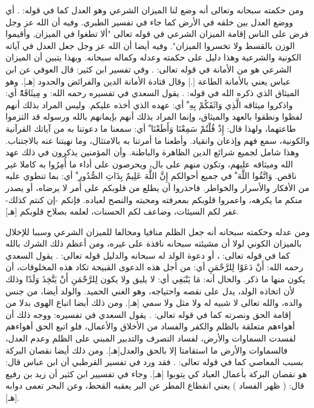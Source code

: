 ومن حكمته سبحانه وتعالى أنه وضع لنا الميزان الشرعي وهو العدل كما في قوله:
\quranayah*[55][7-9]{\footnotesize \surahname*[55]}. أي ووضع العدل بين خلقه في الأرض كما جاء في تفسير الطبري. وفيه أن الله عز وجل فرض على الناس إقامة الميزان الشرعي في قوله تعالى "ألا تطغوا في الميزان, وأقيموا الوزن بالقسط ولا تخسروا الميزان". وفيه أيضا أن الله عز وجل جعل العدل في آياته الكونية والشرعية وهذا دليل على حكمته وعدله وكماله سبحانه. وبهذا يتبين أن الميزان الشرعي هو من الأمانة في قوله تعالى:
\quranayah*[33][72]{\footnotesize \surahname*[33]}. وفي تفسير ابن كثير: قال العوفي عن ابن عباس يعني بالأمانة الطاعة [.] وقال قتادة الأمانة الدين والفرائض والحدود [هـ]. وهو الميثاق الذي ذكره الله في قوله:
\quranayah*[5][7]{\footnotesize \surahname*[5]}. يقول السعدي في تفسيره رحمه الله:
و { مِيثَاقَهُْ} أي: واذكروا ميثاقه { الَّذِي وَاثَقَكُمْ بِهِ ْ} أي: عهده الذي أخذه عليكم. وليس المراد بذلك أنهم لفظوا ونطقوا بالعهد والميثاق، وإنما المراد بذلك أنهم بإيمانهم بالله ورسوله قد التزموا طاعتهما، ولهذا قال: { إِذْ قُلْتُمْ سَمِعْنَا وَأَطَعْنَا ْ} أي: سمعنا ما دعوتنا به من آياتك القرآنية والكونية، سمع فهم وإذعان وانقياد. وأطعنا ما أمرتنا به بالامتثال، وما نهيتنا عنه بالاجتناب. وهذا شامل لجميع شرائع الدين الظاهرة والباطنة. وأن المؤمنين يذكرون في ذلك عهد الله وميثاقه عليهم، وتكون منهم على بال، ويحرصون على أداء ما أُمِرُوا به كاملا غير ناقص. { وَاتَّقُوا اللَّهَ ْ} في جميع أحوالكم { إِنَّ اللَّهَ عَلِيمٌ بِذَاتِ الصُّدُورِ ْ} أي: بما تنطوي عليه من الأفكار والأسرار والخواطر. فاحذروا أن يطلع من قلوبكم على أمر لا يرضاه، أو يصدر منكم ما يكرهه، واعمروا قلوبكم بمعرفته ومحبته والنصح لعباده. فإنكم -إن كنتم كذلك- غفر لكم السيئات، وضاعف لكم الحسنات، لعلمه بصلاح قلوبكم [هـ].

ومن عدله وحكمته سبحانه أنه جعل الظلم منافيا ومخالفا للميزان الشرعي وسببا للإخلال بالميزان الكوني لولا أن مشيئته سبحانه نافذة على غيره، ومن أعظم ذلك الشرك بالله كما في قوله تعالى:
\quranayah*[31][13]{\footnotesize \surahname*[31]}، أو دعوة الولد له سبحانه والدليل قوله تعالى:
\quranayah*[19][88-91]{\footnotesize \surahname*[19]}. يقول السعدي رحمه الله: { أَنْ دَعَوْا لِلرَّحْمَنِ } أي: من أجل هذه الدعوى القبيحة تكاد هذه المخلوقات، أن يكون منها ما ذكر. والحال أنه: { مَا يَنْبَغِي } أي: لا يليق ولا يكون { لِلرَّحْمَنِ أَنْ يَتَّخِذَ وَلَدًا } وذلك لأن اتخاذه الولد، يدل على نقصه واحتياجه، وهو الغني الحميد. والولد أيضا، من جنس والده، والله تعالى لا شبيه له ولا مثل ولا سمي [هـ]. ومن ذلك أيضا اتباع الهوى بدلا من إقامة الحق ونصرته كما في قوله تعالى:
\quranayah*[23][71]{\footnotesize \surahname*[23]}. يقول السعدي في تفسيره:
ووجه ذلك أن أهواءهم متعلقة بالظلم والكفر والفساد من الأخلاق والأعمال، فلو اتبع الحق أهواءهم لفسدت السماوات والأرض، لفساد التصرف والتدبير المبني على الظلم وعدم العدل، فالسماوات والأرض ما استقامتا إلا بالحق والعدل[هـ]. ومن ذلك أيضا نقصان البركة بسبب المعاصي كما في قوله تعالى:
\quranayah*[30][41]{\footnotesize \surahname*[30]}. فقد ورد في تفسير القرطبي أن ابن عباس قال: هو نقصان البركة بأعمال العباد كي يتوبوا [هـ]. وجاء في تفسيير ابن كثير أن زيد بن رفيع قال: ( ظهر الفساد ) يعني انقطاع المطر عن البر يعقبه القحط، وعن البحر تعمى دوابه [هـ].

